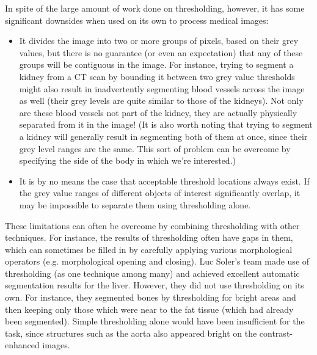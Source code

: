 \noindent In spite of the large amount of work done on thresholding, however, it has some significant downsides when used on its own to process medical images:

\begin{itemize}

\item It divides the image into two or more groups of pixels, based on their grey values, but there is no guarantee (or even an expectation) that any of these groups will be contiguous in the image. For instance, trying to segment a kidney from a CT scan by bounding it between two grey value thresholds might also result in inadvertently segmenting blood vessels across the image as well (their grey levels are quite similar to those of the kidneys). Not only are these blood vessels not part of the kidney, they are actually physically separated from it in the image! (It is also worth noting that trying to segment a kidney will generally result in segmenting both of them at once, since their grey level ranges are the same. This sort of problem can be overcome by specifying the side of the body in which we're interested.)

\item It is by no means the case that acceptable threshold locations always exist. If the grey value ranges of different objects of interest significantly overlap, it may be impossible to separate them using thresholding alone.

\end{itemize}


These limitations can often be overcome by combining thresholding with other techniques. For instance, the results of thresholding often have gaps in them, which can sometimes be filled in by carefully applying various morphological operators (e.g. morphological opening and closing). Luc Soler's team \cite{soler01} made use of thresholding (as one technique among many) and achieved excellent automatic segmentation results for the liver. However, they did not use thresholding on its own. For instance, they segmented bones by thresholding for bright areas and then keeping only those which were near to the fat tissue (which had already been segmented). Simple thresholding alone would have been insufficient for the task, since structures such as the aorta also appeared bright on the contrast-enhanced images.

